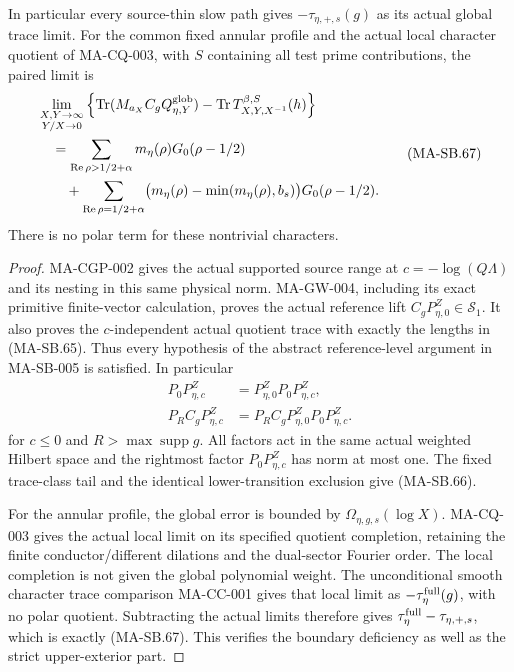 In particular every source-thin slow path gives
$-\tau_{\eta,+,s}(g)$ as its actual global trace limit.
For the common fixed annular profile and the actual
local character quotient of MA-CQ-003, with $S$
containing all test prime contributions, the paired
limit is
\[
 \begin{split}
 &\lim_{\substack{X,Y\to\infty\\Y/X\to0}}
 \left\{\operatorname{Tr}(M_{a_X}C_gQ_{\eta,Y}^{\rm glob})
             -\operatorname{Tr}T^{\beta,S}_{X,Y,X^{-1}}(h)\right\}\\
 &\quad=\sum_{\operatorname{Re}\rho>1/2+\alpha}
                      m_\eta(\rho)G_0(\rho-1/2)\\
 &\qquad+\sum_{\operatorname{Re}\rho=1/2+\alpha}
       \bigl(m_\eta(\rho)-\min(m_\eta(\rho),b_s)\bigr)
                                      G_0(\rho-1/2).
 \end{split}
 \tag{MA-SB.67}
\]
There is no polar term for these nontrivial characters.

\begin{proof}
MA-CGP-002 gives the actual supported source range
at $c=-\log(Q\Lambda)$ and its nesting in this same
physical norm.  MA-GW-004, including its exact
primitive finite-vector calculation, proves the
actual reference lift $C_gP_{\eta,0}^Z\in\mathcal S_1$.
It also proves the $c$-independent actual quotient
trace with exactly the lengths in (MA-SB.65).
Thus every hypothesis of the abstract reference-level
argument in MA-SB-005 is satisfied.
In particular
\[
 \begin{aligned}
 P_0P_{\eta,c}^Z&=P_{\eta,0}^ZP_0P_{\eta,c}^Z,\\
 P_RC_gP_{\eta,c}^Z
      &=P_RC_gP_{\eta,0}^ZP_0P_{\eta,c}^Z.
 \end{aligned}
 \tag{MA-SB.68}
\]
for $c\le0$ and $R>\max\operatorname{supp}g$.
All factors act in the same actual weighted Hilbert
space and the rightmost factor $P_0P_{\eta,c}^Z$
has norm at most one.
The fixed trace-class tail and the identical
lower-transition exclusion give (MA-SB.66).

For the annular profile, the global error is bounded
by $\Omega_{\eta,g,s}(\log X)$.
MA-CQ-003 gives the actual local limit on its
specified quotient completion, retaining the
finite conductor/different dilations and the
dual-sector Fourier order.  The local completion
is not given the global polynomial weight.
The unconditional smooth character trace comparison
MA-CC-001 gives that local limit as
$-\tau_\eta^{\rm full}(g)$, with no polar quotient.
Subtracting the actual limits therefore gives
$\tau_\eta^{\rm full}-\tau_{\eta,+,s}$, which is
exactly (MA-SB.67).  This verifies the boundary
deficiency as well as the strict upper-exterior part.
\end{proof}

